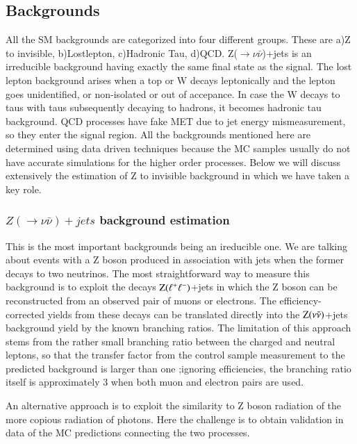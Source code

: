 \subsection{Backgrounds}


All the SM backgrounds are categorized into four different groups. These are a)Z to invisible, b)Lostlepton, c)Hadronic Tau, d)QCD. Z($\rightarrow \nu\bar{\nu}$)+jets is an irreducible background having exactly the same final state as the signal. The lost lepton background arises when a top or W decays leptonically and the lepton goes unidentified, or non-isolated or out of accepance. In case the W decays to taus with taus subsequently decaying to hadrons, it becomes hadronic tau background. QCD processes have fake MET due to jet energy mismeasurement, so they enter the signal region. All the backgrounds mentioned here are determined using data driven techniques because the MC samples usually do not have accurate simulations for  the higher order processes. Below we will discuss extensively the estimation of Z to invisible background in which we have taken a key role.  

\subsubsection{$Z(\rightarrow \nu \bar{\nu})+jets$ background estimation}

This is the most important backgrounds being an ireducible one. We are talking about events with a Z boson produced in association with jets when the   former decays to two neutrinos. The most straightforward way to measure this background is
to exploit the decays $\rm Z(\ell^{+} \ell^{-})$+jets in which the Z boson can be
reconstructed from an observed pair of muons or electrons.  The
efficiency-corrected yields from these decays can be translated
directly into the $\rm Z(\nu \bar{\nu})$+jets background yield by the known branching
ratios.  The limitation of this approach stems from the rather small
branching ratio between the charged and neutral leptons, so that the
transfer factor from the control sample measurement to the predicted
background is larger than one ;ignoring efficiencies, the
branching ratio itself is approximately 3 when both muon and electron
pairs are used. 

An alternative approach is to exploit the similarity to Z boson
radiation of the more copious radiation of photons.  Here the
challenge is to obtain validation in data of the MC predictions
connecting the two processes.

